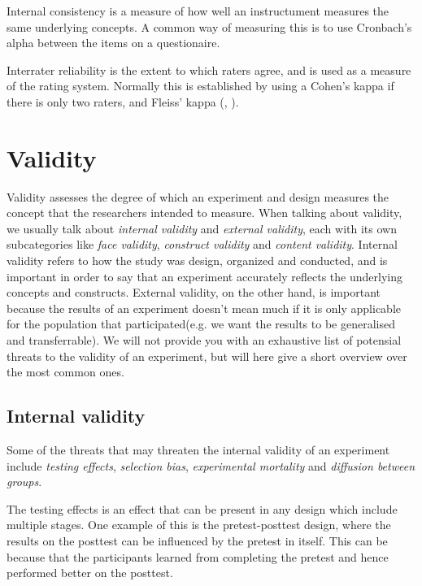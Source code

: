 	\bigskip\noindent
	Internal consistency is a measure of how well an instructument measures the same underlying concepts. A common way of measuring this is to use Cronbach's alpha between the items on a questionaire.
	
	\bigskip\noindent
	Interrater reliability is the extent to which raters agree, and is used as a measure of the rating system. Normally this is established by using a Cohen's kappa if there is only two raters, and Fleiss' kappa (\cite{gwet2001handbook}, \cite{shrout1979intraclass}).
	
\section{Validity}
	Validity assesses the degree of which an experiment and design measures the concept that the researchers intended to measure.
	When talking about validity, we usually talk about \textit{internal validity} and \textit{external validity}, each with its own subcategories like \textit{face validity}, \textit{construct validity} and \textit{content validity}.
	Internal validity refers to how the study was design, organized and conducted, and is important in order to say that an experiment
 accurately reflects the underlying concepts and constructs. 
External validity, on the other hand, is important because the results of an experiment doesn't mean much if it is only applicable for the population that participated(e.g. we want the results to be generalised and transferrable).
	We will not provide you with an exhaustive list of potensial threats to the validity of an experiment, but will here give a short overview over the most common ones.
	
	\subsection{Internal validity}
	Some of the threats that may threaten the internal validity of an experiment include \textit{testing effects}, \textit{selection bias}, \textit{experimental mortality} and \textit{diffusion between groups}.
	
	\bigskip\noindent
	The testing effects is an effect that can be present in any design which include multiple stages. 
	One example of this is the pretest-posttest design, where the results on the posttest can be influenced by the pretest in itself. 
	This can be because that the participants learned from completing the pretest and hence performed better on the posttest.
	
